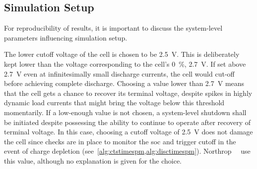 \subsection{Simulation Setup}\label{subsec:basicspmsimsetup}

For  reproducibility of  results, it  is important  to discuss  the system-level
parameters influencing simulation setup.

The  lower cutoff  voltage of  the cell  is chosen  to be  \SI{2.5}{\volt}. This
is  deliberately  kept  lower  than  the voltage  corresponding  to  the  cell's
\SI{0}{\percent},  \ie{}  \SI{2.7}{\volt}.  If set  above  \SI{2.7}{\volt}  even
at  infinitesimally small  discharge  currents, the  cell  would cut-off  before
achieving complete discharge. Choosing a value lower than \SI{2.7}{V} means that
the cell gets a chance to recover its terminal voltage, despite spikes in highly
dynamic  load  currents  that  might  bring the  voltage  below  this  threshold
momentarily. If a low-enough value is  not chosen, a system-level shutdown shall
be  initiated  despite possessing  the  ability  to  continue to  operate  after
recovery  of terminal  voltage.  In  this case,  choosing  a  cutoff voltage  of
\SI{2.5}{\volt}  does  not  damage  the  cell  since  checks  are  in  place  to
monitor  the \gls{soc}  and  trigger cutoff  in the  event  of charge  depletion
(see~\cref{alg:ctstimespm,alg:disctimespm}).  Northrop~\etal~\cite{Northrop2011}
use this value, although no explanation is given for the choice.

